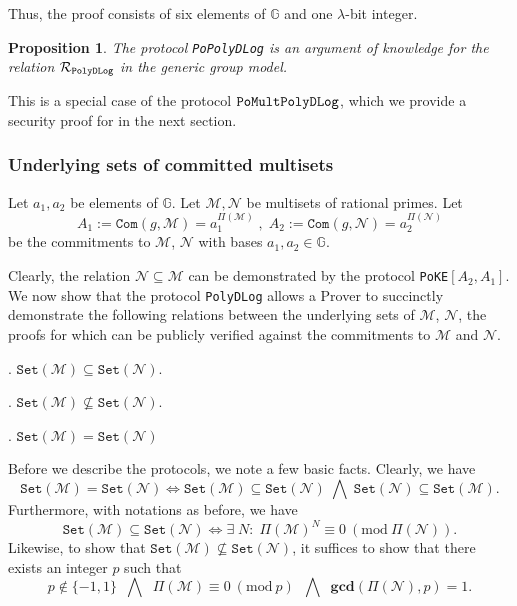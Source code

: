 \documentclass[11pt, lettersize, notitlepage, leqno, footskip=0.6cm]{article}
\newcommand{\ttt}{\texttt}
\newcommand{\bG}{\mathbb{G}}
\newcommand{\sett}{\ttt{Set}}
\newcommand{\LRA}{\Longleftrightarrow}
\newcommand{\mc}{\mathcal}
\newcommand{\mb}{\mathbb}
\newcommand{\mbf}{\mathbf}
\newcommand{\lam}{\lambda}
\newcommand{\sub}{\subseteq}
\newcommand{\nsub}{\nsubseteq}
\newcommand{\vs}{\vspace{-0.15cm}}
\newcommand{\noin}{\noindent}
\newcommand{\Mod}[1]{\ (\mathrm{mod}\ #1)}
\newcommand{\GCD}{\mbf{gcd}}
\newtheorem{Prop}[Thm]{Proposition}
\numberwithin{equation}{section}
\begin{document}
\noindent Thus, the proof consists of six elements of $\mb{G}$ and one $\lam$-bit integer.

\begin{Prop} The protocol \verb|PoPolyDLog| is an argument of knowledge for the relation $\mc{R}_{\tt{PolyDLog}}$ in the generic group
model.\end{Prop}

\begin{prf} This is a special case of the protocol \hyperlink{Mult}{$\tt{PoMultPolyDLog}$}, which we provide a security proof for in the next section.\end{prf}





\subsubsection{\fontsize{11}{11}\selectfont Underlying sets of committed multisets} 

\noin Let $a_1,a_2$ be elements of $\mb{G}$. Let $\mc{M} , \mc{N}$ be multisets of rational primes. Let \vs $$A_1:= \ttt{Com}(g, \mc{M}) =  a_1^{\Pi(\mc{M})}\;,\; A_2:= \ttt{Com}(g, \mc{N}) = a_2^{\Pi(\mc{N})}$$ be the commitments to $\mc{M}$, $\mc{N}$ with bases $a_1, a_2\in \bG$.

Clearly, the relation $\mc{N}\sub \mc{M}$ can be demonstrated by the protocol \verb|PoKE|$[A_2, A_1]$. We now show that the protocol \verb|PolyDLog| allows a Prover to succinctly demonstrate the following relations between the underlying sets of $\mc{M}$, $\mc{N}$, the proofs for which can be publicly verified against the commitments to $\mc{M}$ and $\mc{N}$.\vspace{0.1cm}

\noin 1. $\sett(\mc{M})\sub \sett(\mc{N})$.

\noin 2. $\sett(\mc{M})\nsub \sett(\mc{N})$.

\noin 3. $\sett(\mc{M}) = \sett(\mc{N})$ \vspace{0.1cm}

\noin Before we describe the protocols, we note a few basic facts. Clearly, we have \vs $$\sett(\mc{M}) = \sett(\mc{N})\LRA \sett(\mc{M}) \sub \sett(\mc{N})\;\bigwedge\; \sett(\mc{N}) \sub \sett(\mc{M}).$$ Furthermore, with notations as before, we have \vs $$\sett(\mc{M})\sub \sett(\mc{N})\LRA \exists\; N:\;\Pi(\mc{M})^N\equiv 0\Mod{\Pi(\mc{N})}.$$ Likewise, to show that $\sett(\mc{M})\nsub \sett(\mc{N})$, it suffices to show that there exists an integer $p$ such that \vs $$p\notin \{-1,1\}   \;\;\bigwedge\;\;\Pi(\mc{M})\equiv 0\Mod{p} \;\;\bigwedge\;\; \GCD(\Pi(\mc{N}),{p})=1.$$
\end{document}
